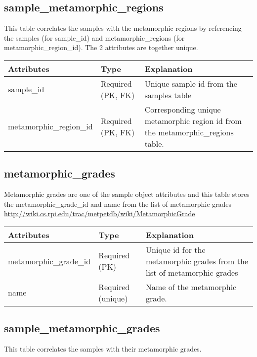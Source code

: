 \documentclass[letterpaper,10pt,english]{sphinxmanual}
\begin{document}
\subsection{sample\_metamorphic\_regions}
\label{Table_Description:sample-metamorphic-regions}
This table correlates the samples with the metamorphic regions by referencing the samples (for sample\_id) and metamorphic\_regions (for metamorphic\_region\_id). The 2 attributes are together unique.

\begin{tabulary}{\linewidth}{|L|L|L|}
\hline
\textbf{
Attributes
} & \textbf{
Type
} & \textbf{
Explanation
}\\\hline

sample\_id
 & 
Required (PK, FK)
 & 
Unique sample id from the samples table
\\\hline

metamorphic\_region\_id
 & 
Required (PK, FK)
 & 
Corresponding unique metamorphic region id from the
metamorphic\_regions table.
\\\hline
\end{tabulary}



\subsection{metamorphic\_grades}
\label{Table_Description:metamorphic-grades}
Metamorphic grades are one of the sample object attributes and this table stores the metamorphic\_grade\_id and name from the list of metamorphic grades \href{http://wiki.cs.rpi.edu/trac/metpetdb/wiki/MetamorphicGrade}{http://wiki.cs.rpi.edu/trac/metpetdb/wiki/MetamorphicGrade}

\begin{tabulary}{\linewidth}{|L|L|L|}
\hline
\textbf{
Attributes
} & \textbf{
Type
} & \textbf{
Explanation
}\\\hline

metamorphic\_grade\_id
 & 
Required (PK)
 & 
Unique id for the metamorphic grades from the list of metamorphic
grades
\\\hline

name
 & 
Required (unique)
 & 
Name of the metamorphic grade.
\\\hline
\end{tabulary}



\subsection{sample\_metamorphic\_grades}
\label{Table_Description:sample-metamorphic-grades}
This table correlates the samples with their metamorphic grades.
\end{document}
